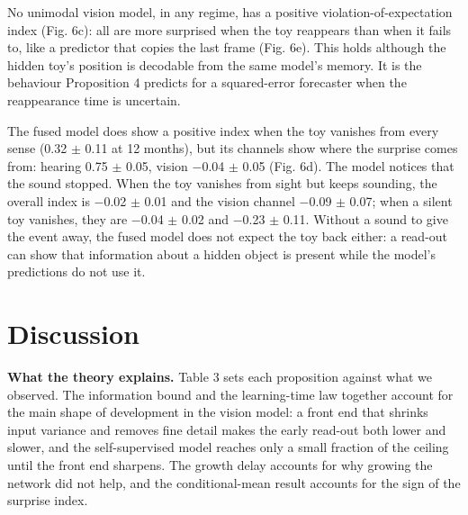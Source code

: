 \documentclass{article}
\begin{document}
No unimodal vision model, in any regime, has a positive violation-of-expectation index (Fig. 6c): all are more surprised when the toy reappears than when it fails to, like a predictor that copies the last frame (Fig. 6e). This holds although the hidden toy's position is decodable from the same model's memory. It is the behaviour Proposition 4 predicts for a squared-error forecaster when the reappearance time is uncertain.

The fused model does show a positive index when the toy vanishes from every sense (0.32 \ensuremath{\pm} 0.11 at 12 months), but its channels show where the surprise comes from: hearing 0.75 \ensuremath{\pm} 0.05, vision \ensuremath{-}0.04 \ensuremath{\pm} 0.05 (Fig. 6d). The model notices that the sound stopped. When the toy vanishes from sight but keeps sounding, the overall index is \ensuremath{-}0.02 \ensuremath{\pm} 0.01 and the vision channel \ensuremath{-}0.09 \ensuremath{\pm} 0.07; when a silent toy vanishes, they are \ensuremath{-}0.04 \ensuremath{\pm} 0.02 and \ensuremath{-}0.23 \ensuremath{\pm} 0.11. Without a sound to give the event away, the fused model does not expect the toy back either: a read-out can show that information about a hidden object is present while the model's predictions do not use it.


\section{Discussion}

\textbf{What the theory explains.} Table 3 sets each proposition against what we observed. The information bound and the learning-time law together account for the main shape of development in the vision model: a front end that shrinks input variance and removes fine detail makes the early read-out both lower and slower, and the self-supervised model reaches only a small fraction of the ceiling until the front end sharpens. The growth delay accounts for why growing the network did not help, and the conditional-mean result accounts for the sign of the surprise index.
\end{document}
